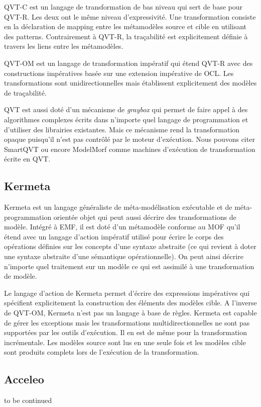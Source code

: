 QVT-C est un langage de transformation de bas niveau qui sert de base pour 
QVT-R. Les deux ont le même niveau d'expressivité. Une transformation consiste 
en la déclaration de mapping entre les métamodèles source et cible en utilisant 
des patterns. Contrairement à QVT-R, la traçabilité est explicitement définie à 
travers les liens entre les métamodèles.

QVT-OM est un langage de transformation impératif qui étend QVT-R avec des 
constructions impératives basée sur une extension impérative de OCL. Les 
transformations sont unidirectionnelles mais établissent explicitement des 
modèles de traçabilité.

QVT est aussi doté d'un mécanisme de \textit{graybox} qui permet de faire appel 
à des algorithmes complexes écrits dans n'importe quel langage de programmation 
et d'utiliser des librairies existantes. Mais ce mécanisme rend la 
transformation opaque puisqu'il n'est pas contrôlé par le moteur d'exécution. 
Nous pouvons citer SmartQVT ou encore ModelMorf comme machines d'exécution de 
transformation écrite en QVT.

\subsection{Kermeta}
Kermeta est un langage généraliste de méta-modélisation exécutable et de 
méta-programmation orientée objet qui peut aussi décrire des transformations de 
modèle. Intégré à EMF, il est doté d'un métamodèle conforme au MOF qu'il étend 
avec un langage d'action impératif utilisé pour écrire le corps des opérations 
définies sur les concepts d'une syntaxe abstraite (ce qui revient à doter une 
syntaxe abstraite d'une sémantique opérationnelle). On peut ainsi décrire 
n'importe quel traitement sur un modèle ce qui est assimilé à une transformation 
de modèle.

Le langage d'action de Kermeta permet d'écrire des expressions impératives qui 
spécifient explicitement la construction des éléments des modèles cible. A 
l'inverse de QVT-OM, Kermeta n'est pas un langage à base de règles.  
Kermeta est capable de gérer les exceptions mais les transformations 
multidirectionnelles ne sont pas supportées par les outils d'exécution. Il en 
est de même pour la transformation incrémentale. Les modèles source sont lus en 
une seule fois et les modèles cible sont produits complets lors de l'exécution 
de la transformation.

\subsection{Acceleo}
to be continued

